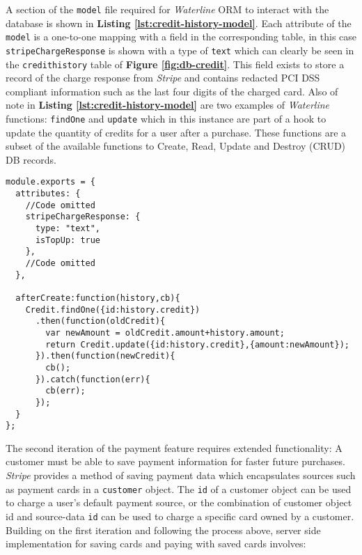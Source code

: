 A section of the \texttt{model} file required for \textit{Waterline} ORM to interact with the database is shown in \textbf{Listing \ref{lst:credit-history-model}}. Each attribute of the \texttt{model} is a one-to-one mapping with a field in the corresponding table, in this case \texttt{stripeChargeResponse} is shown with a type of \texttt{text} which can clearly be seen in the \texttt{credithistory} table of \textbf{Figure \ref{fig:db-credit}}. This field exists to store a record of the charge response from \textit{Stripe} and contains redacted PCI DSS compliant information such as the last four digits of the charged card. Also of note in \textbf{Listing \ref{lst:credit-history-model}} are two examples of \textit{Waterline} functions: \texttt{findOne} and \texttt{update} which in this instance are part of a hook to update the quantity of credits for a user after a purchase. These functions are a subset of the available functions to Create, Read, Update and Destroy (CRUD) DB records.

\begin{listing}[H]
\begin{verbatim}
module.exports = {
  attributes: {
    //Code omitted
    stripeChargeResponse: {
      type: "text",
      isTopUp: true
    },
    //Code omitted
  },

  afterCreate:function(history,cb){
    Credit.findOne({id:history.credit})
      .then(function(oldCredit){
        var newAmount = oldCredit.amount+history.amount;
        return Credit.update({id:history.credit},{amount:newAmount});
      }).then(function(newCredit){
        cb();
      }).catch(function(err){
        cb(err);
      });
  }
};

\end{verbatim}
\label{lst:credit-history-model}
\end{listing}

The second iteration of the payment feature requires extended functionality: A customer must be able to save payment information for faster future purchases. \textit{Stripe} provides a method of saving payment data which encapsulates sources such as payment cards in a \texttt{customer} object. The \texttt{id} of a customer object can be used to charge a user's default payment source, or the combination of customer object id and source-data \texttt{id} can be used to charge a specific card owned by a customer. Building on the first iteration and following the process above, server side implementation for saving cards and paying with saved cards involves:

